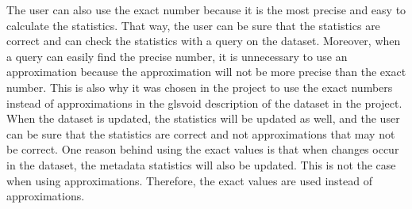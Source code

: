 The user can also use the exact number because it is the most precise and easy to calculate the statistics. That way, the user can be sure that the statistics are correct and can check the statistics with a query on the dataset. Moreover, when a query can easily find the precise number, it is unnecessary to use an approximation because the approximation will not be more precise than the exact number.
This is also why it was chosen in the project to use the exact numbers instead of approximations in the  gls{void} description of the dataset in the project. When the dataset is updated, the statistics will be updated as well, and the user can be sure that the statistics are correct and not approximations that may not be correct. One reason behind using the exact values is that when changes occur in the dataset, the metadata statistics will also be updated. This is not the case when using approximations. Therefore, the exact values are used instead of approximations.




